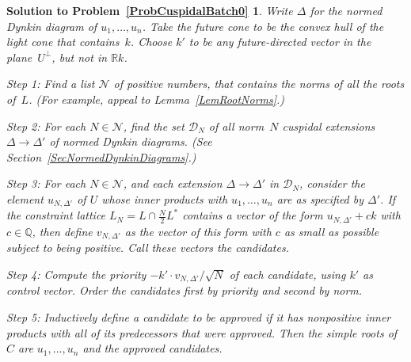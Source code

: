 \documentclass[12pt]{amsart}
\def\calD{\mathcal{D}}
\def\calN{\mathcal{N}}
\def\R{\mathbb{R}}
\def\Q{\mathbb{Q}}
\def\D{\Delta}
\numberwithin{theorem}{section}
\numberwithin{equation}{section}
\numberwithin{figure}{section}
\newtheorem*{SolutionToCuspidalBatch0}{Solution to Problem~\ref{ProbCuspidalBatch0}}
\theoremstyle{remark}
\begin{document}
\begin{SolutionToCuspidalBatch0}
    Write $\Delta$ for the normed Dynkin
    diagram of $u_1,\dots,u_n$.
    Take the future cone to be the convex hull of the light cone that
    contains~$k$.
    Choose $k'$ to be any future-directed vector in the plane~$U^\perp$,
    but not in $\R k$.  

Step 1: Find a list $\calN$ of positive numbers, that contains the
    norms of all the roots of~$L$. (For example, appeal to Lemma~\ref{LemRootNorms}.)

    Step 2: For each $N\in\calN$, find the set $\calD_N$ of all norm~$N$ cuspidal 
    extensions $\D\to\D'$ of normed Dynkin diagrams. (See Section~\ref{SecNormedDynkinDiagrams}.)

    Step 3: For each $N\in\calN$, and each extension $\D\to\D'$ in $\calD_N$,
    consider the element $u_{N,\D'}$ of $U$ whose inner products with
    $u_1,\dots,u_n$ are as specified by $\D'$.  If the
    constraint lattice $L_N=L\cap\frac{N}{2}L^*$
    contains a vector of the form $u_{N,\D'}+c k$ with $c\in\Q$, then define
    $v_{N,\D'}$ as the vector of this form with $c$ as small as possible
    subject to being positive.  Call 
     these vectors the candidates.

    Step 4: 
    Compute the priority $-k'\cdot v_{N,\D'}/\sqrt{N}$ of each candidate,
    using $k'$ as control vector.
    Order the candidates first by priority and second by norm.

    Step 5: 
    Inductively define a candidate to be approved if it has nonpositive inner products
    with all of its predecessors that were approved.   Then 
    the simple roots of~$C$ are $u_1,\dots,u_n$ and the approved candidates.
\end{SolutionToCuspidalBatch0}
\end{document}
